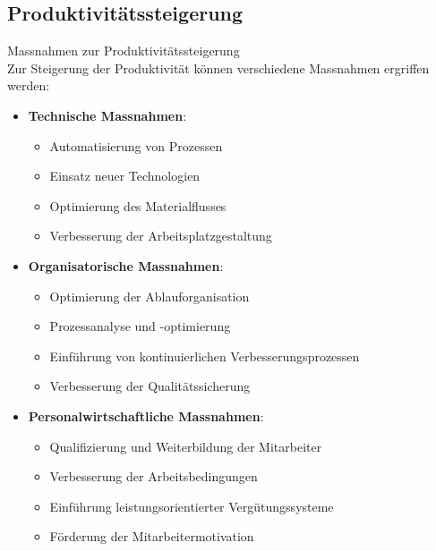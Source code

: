\subsection{Produktivitätssteigerung}

\begin{definition}{Massnahmen zur Produktivitätssteigerung}\\
Zur Steigerung der Produktivität können verschiedene Massnahmen ergriffen werden:
\begin{itemize}
    \item \textbf{Technische Massnahmen}:
    \begin{itemize}
        \item Automatisierung von Prozessen
        \item Einsatz neuer Technologien
        \item Optimierung des Materialflusses
        \item Verbesserung der Arbeitsplatzgestaltung
    \end{itemize}
    \item \textbf{Organisatorische Massnahmen}:
    \begin{itemize}
        \item Optimierung der Ablauforganisation
        \item Prozessanalyse und -optimierung
        \item Einführung von kontinuierlichen Verbesserungsprozessen
        \item Verbesserung der Qualitätssicherung
    \end{itemize}
    \item \textbf{Personalwirtschaftliche Massnahmen}:
    \begin{itemize}
        \item Qualifizierung und Weiterbildung der Mitarbeiter
        \item Verbesserung der Arbeitsbedingungen
        \item Einführung leistungsorientierter Vergütungssysteme
        \item Förderung der Mitarbeitermotivation
    \end{itemize}
\end{itemize}
\end{definition}

